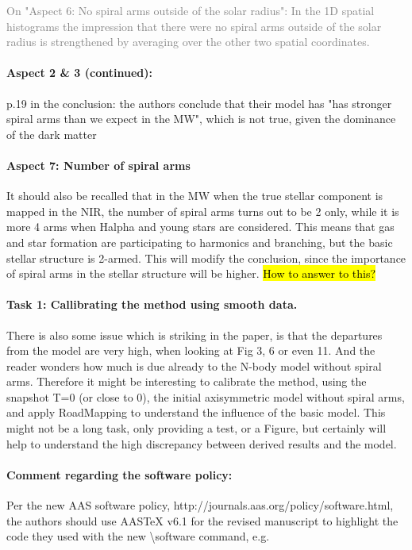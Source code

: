 \documentclass[10pt,a4paper]{article}
\newcommand{\Answer}[1]{\textcolor{Gray}{#1}}
\begin{document}
\Answer{On "Aspect 6: No spiral arms outside of the solar radius": In the 1D spatial histograms the impression that there were no spiral arms outside of the solar radius is strengthened by averaging over the other two spatial coordinates.}

\paragraph{Aspect 2 \& 3 (continued):} p.19 in the conclusion: the authors conclude that their model has "has stronger spiral arms than we expect in the MW", which is not true, given the dominance of
the dark matter

\paragraph{Aspect 7: Number of spiral arms} It should also be recalled that in the MW when the true stellar component is mapped
in the NIR, the number of spiral arms turns out to be 2 only, while it is more 4
arms when Halpha and young stars are considered. This means that gas and star
formation are participating to harmonics and branching, but the basic stellar
structure is 2-armed. This will modify the conclusion, since the importance of
spiral arms in the stellar structure will be higher. \hl{How to answer to this?}

\paragraph{Task 1: Callibrating the method using smooth data.} There is also some issue which is striking in the paper, is that the departures from
the model are very high, when looking at Fig 3, 6 or even 11. And the reader wonders
how much is due already to the N-body model without spiral arms. Therefore it might
be interesting to calibrate the method, using the snapshot T=0 (or close to 0), the
initial axisymmetric model without spiral arms, and apply RoadMapping to understand
the  influence of the basic model. This might not be a long task, only providing a
test, or a Figure, but certainly will help to understand the high discrepancy
between derived results and the model.

\paragraph{Comment regarding the software policy:}

Per the new AAS software policy, http://journals.aas.org/policy/software.html, the
authors should use AASTeX v6.1 for the revised manuscript to highlight the code they
used with the new {\textbackslash}software command, e.g.
\end{document}
